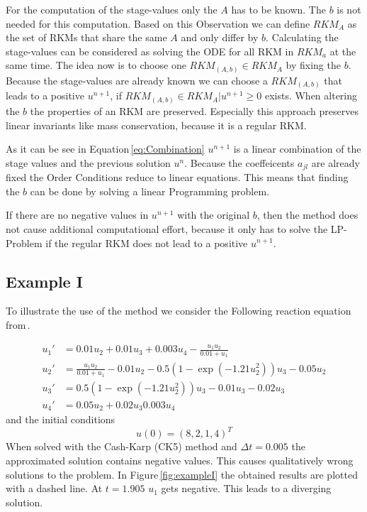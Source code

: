 \documentclass{article}
\begin{document}
For the computation of the stage-values only the $A$ has to be known. The $b$ is not needed for this computation. 
Based on this Observation we can define $RKM_{A}$ as the set of RKMs that share the same $A$ and only differ by $b$.
Calculating the stage-values can be considered as solving the ODE for all RKM in $RKM_a$ at the same time.
The idea now is to choose one $RKM_{(A,b)} \in RKM_{A}$ by fixing the $b$. 
Because the stage-values are already known we can choose a $RKM_{(A,b)}$ that leads to a positive $u^{n+1}$, if $RKM_{(A,b)} \in RKM_{A} | u^{n+1} \geq 0$ exists.
When altering the $b$ the properties of an RKM are preserved. 
Especially this approach preserves linear invariants like mass conservation, because it is a regular RKM. 

As it can be see in Equation\,\ref{eq:Combination} $u^{n+1}$ is a linear combination of the stage values and the previous solution $u^n$.
Because the coeffeicents $a_{jl}$ are already fixed the Order Conditions reduce to linear equations.
This means that finding the $b$ can be done by solving a linear Programming problem.
 
If there are no negative values in $u^{n+1}$ with the original $b$, then the method does not cause additional computational effort, because it only has to solve the LP-Problem if the regular RKM does not lead to a positive $u^{n+1}$. %

\subsection{Example I}\label{sec:example_reac}

To illustrate the use of the method we consider the Following reaction equation from\,\cite{kopecz_comparison_2019}.

\begin{subequations}
\label{eq:Reaction}
\begin{align}
u_1' &= 0.01u_2 + 0.01 u_3 +0.003u_4 - \frac{u_1 u_2}{0.01+u_1} \\
u_2' &= \frac{u_1u_2}{0.01+u_1}-0.01 u_2-0.5(1-\exp(-1.21 u_2^2)) u_3 -0.05 u_2 \\
u_3' &= 0.5(1-\exp(-1.21u_2^2)) u_3 - 0.01 u_3 -0.02 u_3 \\
u_4' &=0.05 u_2 + 0.02 u_3 0.003u_4
\end{align}
\end{subequations}
and the initial conditions
\begin{equation}
u(0) = (8,2,1,4)^T
\end{equation}
When solved with the Cash-Karp (CK5) method and $\Delta t = 0.005$ the approximated solution contains negative values. This causes qualitatively wrong solutions to the problem. 
In Figure\,\ref{fig:exampleI} the obtained results are plotted with a dashed line. 
At $t=1.905$ $u_1$ gets negative. This leads to a diverging solution.
\end{document}
